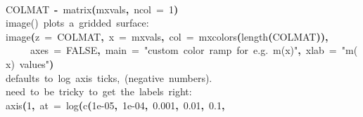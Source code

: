 \documentclass[a4paper]{article}
\newcommand{\hlnumber}[1]{\textcolor[rgb]{0.0823529411764706,0.0784313725490196,0.709803921568627}{#1}}%
\newcommand{\hlfunctioncall}[1]{\textcolor[rgb]{1,0,0}{#1}}%
\newcommand{\hlstring}[1]{\textcolor[rgb]{0.6,0.6,1}{#1}}%
\newcommand{\hlkeyword}[1]{\textcolor[rgb]{0,0,0}{\textbf{#1}}}%
\newcommand{\hlargument}[1]{\textcolor[rgb]{0.694117647058824,0.247058823529412,0.0196078431372549}{#1}}%
\newcommand{\hlcomment}[1]{\textcolor[rgb]{0.8,0.8,0.8}{#1}}%
\newcommand{\hlassignement}[1]{\textcolor[rgb]{0.215686274509804,0.215686274509804,0.384313725490196}{\textbf{#1}}}%
\newcommand{\hlsymbol}[1]{\textcolor[rgb]{0,0,0}{#1}}%
\newcommand{\hlprompt}[1]{\textcolor[rgb]{0,0,0}{#1}}%
\newcommand{\hlstd}[1]{\textcolor[rgb]{0,0,0}{#1}}%
\newenvironment{Houtput}{\raggedright}{%
%
}
\begin{document}
\begin{Houtput}
\normalfont
\hspace*{\fill}\\
\hlstd{}\ttfamily\noindent
\hlprompt{\usebox{\hlnormalsizeboxgreaterthan}{\ }}\hlsymbol{COLMAT}{\ }\hlassignement{\usebox{\hlnormalsizeboxlessthan}-}{\ }\hlfunctioncall{matrix}\hlkeyword{(}\hlsymbol{mxvals}\hlkeyword{,}{\ }\hlargument{ncol}{\ }\hlargument{=}{\ }\hlnumber{1}\hlkeyword{)}\mbox{}
\normalfont
\hspace*{\fill}\\
\hlstd{}\ttfamily\noindent
\hlprompt{\usebox{\hlnormalsizeboxgreaterthan}{\ }}\hlcomment{\usebox{\hlnormalsizeboxhash}{\ }image(){\ }plots{\ }a{\ }gridded{\ }surface:}\mbox{}
\normalfont
\hspace*{\fill}\\
\hlstd{}\ttfamily\noindent
\hlprompt{\usebox{\hlnormalsizeboxgreaterthan}{\ }}\hlfunctioncall{image}\hlkeyword{(}\hlargument{z}{\ }\hlargument{=}{\ }\hlsymbol{COLMAT}\hlkeyword{,}{\ }\hlargument{x}{\ }\hlargument{=}{\ }\hlsymbol{mxvals}\hlkeyword{,}{\ }\hlargument{col}{\ }\hlargument{=}{\ }\hlfunctioncall{mxcolors}\hlkeyword{(}\hlfunctioncall{length}\hlkeyword{(}\hlsymbol{COLMAT}\hlkeyword{)}\hlkeyword{)}\hlkeyword{,}\hspace*{\fill}\\
\hlstd{}\hlprompt{{\ }}{\ }{\ }{\ }{\ }\hlargument{axes}{\ }\hlargument{=}{\ }\hlnumber{FALSE}\hlkeyword{,}{\ }\hlargument{main}{\ }\hlargument{=}{\ }\hlstring{"custom{\ }color{\ }ramp{\ }for{\ }e.g.{\ }m(x)"}\hlkeyword{,}{\ }\hlargument{xlab}{\ }\hlargument{=}{\ }\hlstring{"m(x){\ }values"}\hlkeyword{)}\mbox{}
\normalfont
\hspace*{\fill}\\
\hlstd{}\ttfamily\noindent
\hlprompt{\usebox{\hlnormalsizeboxgreaterthan}{\ }}\hlcomment{\usebox{\hlnormalsizeboxhash}{\ }defaults{\ }to{\ }log{\ }axis{\ }ticks,{\ }(negative{\ }numbers).}\mbox{}
\normalfont
\hspace*{\fill}\\
\hlstd{}\ttfamily\noindent
\hlprompt{\usebox{\hlnormalsizeboxgreaterthan}{\ }}\hlcomment{\usebox{\hlnormalsizeboxhash}{\ }need{\ }to{\ }be{\ }tricky{\ }to{\ }get{\ }the{\ }labels{\ }right:}\mbox{}
\normalfont
\hspace*{\fill}\\
\hlstd{}\ttfamily\noindent
\hlprompt{\usebox{\hlnormalsizeboxgreaterthan}{\ }}\hlfunctioncall{axis}\hlkeyword{(}\hlnumber{1}\hlkeyword{,}{\ }\hlargument{at}{\ }\hlargument{=}{\ }\hlfunctioncall{log}\hlkeyword{(}\hlfunctioncall{c}\hlkeyword{(}\hlnumber{1e-05}\hlkeyword{,}{\ }\hlnumber{1e-04}\hlkeyword{,}{\ }\hlnumber{0.001}\hlkeyword{,}{\ }\hlnumber{0.01}\hlkeyword{,}{\ }\hlnumber{0.1}\hlkeyword{,}\hspace*{\fill}\\

\end{Houtput}
\end{document}
